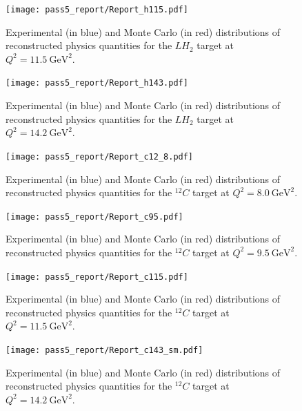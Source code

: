\begin{figure}[!h]
    \centering
    \texttt{[image: pass5\_report/Report\_h115.pdf]}
    \caption{
            Experimental (in blue) and Monte Carlo (in red) distributions of
            reconstructed physics quantities for
            the $LH_2$ target at $Q^2=\SI{11.5}{\giga\electronvolt\squared}$.
            }
    \label{fig:Report_h115.pdf_pg3}
\end{figure}


\begin{figure}[!h]
    \centering
    \texttt{[image: pass5\_report/Report\_h143.pdf]}
    \caption{
            Experimental (in blue) and Monte Carlo (in red) distributions of
            reconstructed physics quantities for
            the $LH_2$ target at $Q^2=\SI{14.2}{\giga\electronvolt\squared}$.
            }
    \label{fig:Report_h143.pdf_pg3}
\end{figure}


\begin{figure}[!h]
    \centering
    \texttt{[image: pass5\_report/Report\_c12\_8.pdf]}
    \caption{
            Experimental (in blue) and Monte Carlo (in red) distributions of
            reconstructed physics quantities for
            the ${}^{12}C$ target at $Q^2=\SI{8.0}{\giga\electronvolt\squared}$.
            }
    \label{fig:Report_c12_8.pdf_pg3}
\end{figure}


\begin{figure}[!h]
    \centering
    \texttt{[image: pass5\_report/Report\_c95.pdf]}
    \caption{
            Experimental (in blue) and Monte Carlo (in red) distributions of
            reconstructed physics quantities for
            the ${}^{12}C$ target at $Q^2=\SI{9.5}{\giga\electronvolt\squared}$.
            }
    \label{fig:Report_c95.pdf_pg3}
\end{figure}


\begin{figure}[!h]
    \centering
    \texttt{[image: pass5\_report/Report\_c115.pdf]}
    \caption{
            Experimental (in blue) and Monte Carlo (in red) distributions of
            reconstructed physics quantities for
            the ${}^{12}C$ target at $Q^2=\SI{11.5}{\giga\electronvolt\squared}$.
            }
    \label{fig:Report_c115.pdf_pg3}
\end{figure}


\begin{figure}[!h]
    \centering
    \texttt{[image: pass5\_report/Report\_c143\_sm.pdf]}
    \caption{
            Experimental (in blue) and Monte Carlo (in red) distributions of
            reconstructed physics quantities for
            the ${}^{12}C$ target at $Q^2=\SI{14.2}{\giga\electronvolt\squared}$.
            }
    \label{fig:Report_c143_sm.pdf_pg3}
\end{figure}

